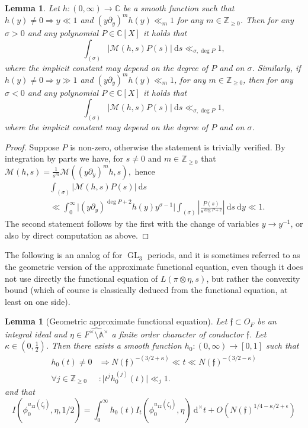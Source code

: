 \documentclass[a4paper,11pt]{amsart}
\newtheorem{lemma}[theorem]{Lemma}
\theoremstyle{definition}
\newcommand{\A}{\mathbb{A}}
\newcommand{\Z}{\mathbb{Z}}
\newcommand{\gelle}{\operatorname{GL}}
\newcommand{\CC}{\mathbb{C}}
\begin{document}
\begin{lemma}\label{lem:decaying}
    Let $h\colon (0,\infty)\to \CC$ be a smooth function such that $h(y)\neq 0 \Rightarrow y \ll 1$ and $(y\partial_y)^mh(y)\ll_m 1$ for any $m\in \Z_{\geq 0}$. 
    Then for any $\sigma>0$ and any polynomial $P \in \CC[X]$ it holds that 
    \[\int_{(\sigma)}\vert{\mathcal{M}(h,s)P(s)}\vert \ \mathrm{d}s \ll_{\sigma,\deg P} 1, \]
    where the implicit constant may depend on the degree of $P$ and on $\sigma$. Similarly, if $h(y)\neq 0 \Rightarrow y\gg 1$ and $(y\partial_y)^mh(y)\ll_m 1$, for any $m\in \Z_{\geq 0}$, then for any $\sigma < 0$ and any polynomial $P\in \CC[X]$ it holds that 
    \[\int_{(\sigma)}\vert{\mathcal{M}(h,s)P(s)}\vert \ \mathrm{d}s \ll_{\sigma,\deg P} 1, \]
    where the implicit constant may depend on the degree of $P$ and on $\sigma$. 
\end{lemma}
\begin{proof} Suppose $P$ is non-zero, otherwise the statement is trivially verified.
     By integration by parts we have, for $s\neq 0$ and $m\in \Z_{\geq 0}$ that 
    $\mathcal{M}(h,s) = \frac{1}{s^m}\mathcal{M}((y\partial_y)^mh,s),$ hence  
    \begin{align*}
        &\int_{(\sigma)}\vert{\mathcal{M}(h,s)P(s)}\vert\ \mathrm{d}s\\ &\ll \int_0^{\infty}\vert{(y\partial_y)^{\deg P + 2}h(y)}y^{\sigma-1}\vert \int_{(\sigma)}\left\vert{\frac{P(s)}{s^{\deg P + 2}}}\right\vert\  \mathrm{d}s\ \mathrm{d}y\ll 1.
    \end{align*}
    The second statement follows by the first with the change of variables $y\to y^{-1}$, or also by direct computation as above.
\end{proof}

 The following is an analog of \cite[Lemma 11.9]{sparse-equidistribution-venkatesh} for $\gelle_3$ periods, and it is sometimes referred to as the geometric version of the approximate functional equation, even though it does not use directly the functional equation of $L(\pi\otimes\eta,s)$, but rather the convexity bound (which of course is classically deduced from the functional equation, at least on one side).
\begin{lemma}[Geometric approximate functional equation]\label{lem:convexitybound} 
Let $\mathfrak{f}\subset O_F$ be an integral ideal and $\eta \in \widehat{F^{\times}\setminus\A^{\times}}$ a finite order character of conductor $\mathfrak{f}$. Let $\kappa \in (0,\frac{1}{2})$. Then there exists a smooth function $h_0 \colon (0,\infty)\to [0,1]$ such that \begin{align*}h_0(t) \neq 0 &\Rightarrow N(\mathfrak{f})^{-(3/2+\kappa)}\ll t\ll N(\mathfrak{f})^{-(3/2-\kappa)}\\
\forall j\in \Z_{\geq 0}&: \vert t^j h_0^{(j)}(t)\vert\ll_j 1. \end{align*} and that
\begin{equation*}\label{eq:geometricapprox}
        I(\phi_0^{u_{12}(\zeta_{\mathfrak{f}})},\eta,1/2) = \int_{0}^{\infty}h_0(t)I_t(\phi_0^{u_{12}(\zeta_{\mathfrak{f}})},\eta)\ \mathrm{d}^{\times}t + O(N(\mathfrak{f})^{1/4-\kappa/2+\epsilon}) 
    \end{equation*}
\end{lemma}
\end{document}
